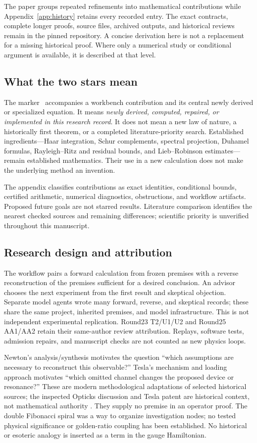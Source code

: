 The paper groups repeated refinements into mathematical contributions while Appendix~\ref{app:history} retains every recorded entry. The exact contracts, complete longer proofs, source files, archived outputs, and historical reviews remain in the pinned repository. A concise derivation here is not a replacement for a missing historical proof. Where only a numerical study or conditional argument is available, it is described at that level.

\subsection{What the two stars mean}
The marker \workstar\ accompanies a workbench contribution and its central newly derived or specialized equation. It means \emph{newly derived, computed, repaired, or implemented in this research record}. It does not mean a new law of nature, a historically first theorem, or a completed literature-priority search. Established ingredients---Haar integration, Schur complements, spectral projection, Duhamel formulas, Rayleigh--Ritz and residual bounds, and Lieb--Robinson estimates---remain established mathematics. Their use in a new calculation does not make the underlying method an invention.

The appendix classifies contributions as exact identities, conditional bounds, certified arithmetic, numerical diagnostics, obstructions, and workflow artifacts. Proposed future goals are not starred results. Literature comparison identifies the nearest checked sources and remaining differences; scientific priority is unverified throughout this manuscript.

\subsection{Research design and attribution}
The workflow pairs a forward calculation from frozen premises with a reverse reconstruction of the premises sufficient for a desired conclusion. An advisor chooses the next experiment from the first result and skeptical objection. Separate model agents wrote many forward, reverse, and skeptical records; these share the same project, inherited premises, and model infrastructure. This is not independent experimental replication. Round23 T2/U1/U2 and Round25 AA1/AA2 retain their same-author review attribution. Replays, software tests, admission repairs, and manuscript checks are not counted as new physics loops.

Newton's analysis/synthesis motivates the question ``which assumptions are necessary to reconstruct this observable?'' Tesla's mechanism and loading approach motivates ``which omitted channel changes the proposed device or resonance?'' These are modern methodological adaptations of selected historical sources; the inspected Opticks discussion and Tesla patent are historical context, not mathematical authority \cite{newton_opticks,tesla1905patent}. They supply no premise in an operator proof. The double Fibonacci spiral was a way to organize investigation nodes; no tested physical significance or golden-ratio coupling has been established. No historical or esoteric analogy is inserted as a term in the gauge Hamiltonian.

